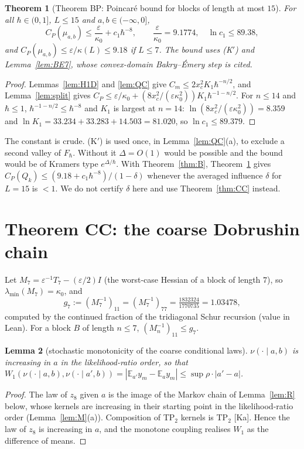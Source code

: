\documentclass[11pt,a4paper]{article}
\newtheorem{theorem}{Theorem}[section]
\newtheorem{lemma}[theorem]{Lemma}
\theoremstyle{definition}
\theoremstyle{remark}
\newcommand{\E}{\mathbb{E}}
\newcommand{\xc}{x_c}
\begin{document}
\begin{theorem}[Theorem BP: Poincar\'e bound for blocks of length at most $15$]\label{thm:BP}
For all $\hbar\in(0,1]$, $L\le15$ and $a,b\in(-\infty,0]$,
\[
C_P(\mu_{a,b})\le\frac{\varepsilon}{\kappa_0}+c_1\hbar^{-8},\qquad \frac{\varepsilon}{\kappa_0}=9.1774,\quad \ln c_1\le89.38 ,
\]
and $C_P(\mu_{a,b})\le\varepsilon/\kappa(L)\le9.18$ if $L\le7$. The bound uses \textup{(K$'$)} and Lemma~\ref{lem:BE7}, whose convex-domain Bakry--\'Emery step is cited.
\end{theorem}
\begin{proof}
Lemmas~\ref{lem:H1D} and \ref{lem:QC} give $C_m\le2\xc^2K_1\hbar^{-n/2}$, and Lemma~\ref{lem:split} gives $C_P\le\varepsilon/\kappa_0+(8\xc^2/(\varepsilon\kappa_0^2))K_1\hbar^{-1-n/2}$. For $n\le14$ and $\hbar\le1$, $\hbar^{-1-n/2}\le\hbar^{-8}$ and $K_1$ is largest at $n=14$: $\ln(8\xc^2/(\varepsilon\kappa_0^2))=8.359$ and $\ln K_1=33.234+33.283+14.503=81.020$, so $\ln c_1\le89.379$.
\end{proof}

The constant is crude. (K$'$) is used once, in Lemma~\ref{lem:QC}(a), to exclude a second valley of $F_\hbar$. Without it $\Delta=O(1)$ would be possible and the bound would be of Kramers type $e^{\Delta/\hbar}$. With Theorem~\ref{thm:B}, Theorem~\ref{thm:BP} gives $C_P(Q_k)\le(9.18+c_1\hbar^{-8})/(1-\delta)$ whenever the averaged influence $\delta$ for $L=15$ is $<1$. We do not certify $\delta$ here and use Theorem~\ref{thm:CC} instead.

\section{Theorem CC: the coarse Dobrushin chain}\label{sec:CC}

Let $M_7=\varepsilon^{-1}T_7-(\varepsilon/2)I$ (the worst-case Hessian of a block of length $7$), so $\lambda_{\min}(M_7)=\kappa_0$, and
\[
g_7:=(M_7^{-1})_{11}=(M_7^{-1})_{77}=\tfrac{1832324}{1770735}=1.03478 ,
\]
computed by the continued fraction of the tridiagonal Schur recursion (value in Lean). For a block $B$ of length $n\le7$, $(M_n^{-1})_{11}\le g_7$.

\begin{lemma}[stochastic monotonicity of the coarse conditional laws]\label{lem:B1}
$\nu(\cdot\mid a,b)$ is increasing in $a$ in the likelihood-ratio order, so that $W_1(\nu(\cdot\mid a,b),\nu(\cdot\mid a',b))=|\E_{a'}y_m-\E_ay_m|\le\sup\rho\cdot|a'-a|$.
\end{lemma}
\begin{proof}
The law of $z_8$ given $a$ is the image of the Markov chain of Lemma~\ref{lem:R} below, whose kernels are increasing in their starting point in the likelihood-ratio order (Lemma~\ref{lem:M}(a)). Composition of TP$_2$ kernels is TP$_2$ [Ka]. Hence the law of $z_8$ is increasing in $a$, and the monotone coupling realises $W_1$ as the difference of means.
\end{proof}
\end{document}
